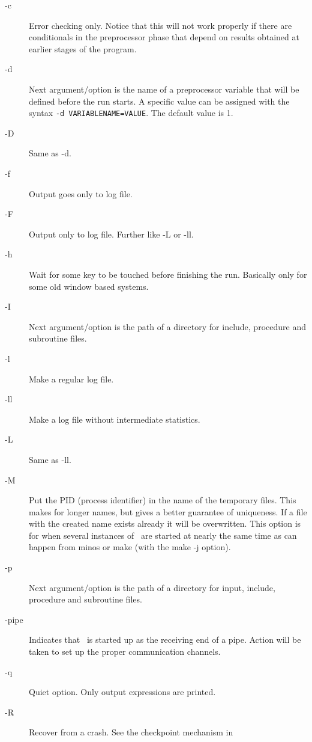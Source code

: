 \begin{description}
\item[-c] Error checking only. Notice that this will not work 
     properly if there are conditionals in the preprocessor phase that 
     depend on results obtained at earlier stages of the program.
\item[-d] Next argument/option is the name of a preprocessor 
     variable that will be defined before the run starts. A specific value can be assigned with the
	 syntax {\tt -d VARIABLENAME=VALUE}. The default value is 1.
\item[-D] Same as -d.
\item[-f] Output goes only to log file.
\item[-F] Output only to log file. Further like -L or -ll.
\item[-h] Wait for some key to be touched before finishing the run.
     Basically only for some old window based systems.
\item[-I] Next argument/option is the path of a directory for 
     include, procedure and subroutine files.
\item[-l] Make a regular log file.
\item[-ll] Make a log file without intermediate statistics.
\item[-L] Same as -ll.
\item[-M] Put the PID (process identifier) in the name of the temporary 
     files. This makes for longer names, but gives a better guarantee of 
     uniqueness. If a file with the created name exists already it will be 
     overwritten. This option is for when several instances of \FORM\ are 
     started at nearly the same time as can happen from minos or make (with 
     the make -j option).
\item[-p] Next argument/option is the path of a directory for 
     input, include, procedure and subroutine files.
\item[-pipe] Indicates that \FORM\ is started up as the receiving 
     end of a pipe. Action will be taken to set up the proper communication 
     channels.
\item[-q] Quiet option. Only output expressions are printed.
\item[-R] Recover from a crash. See the checkpoint mechanism in 

\end{description}
